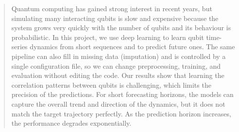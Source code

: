 \begin{abstract}

Quantum computing has gained strong interest in recent years, but simulating many interacting qubits is slow and expensive because the system grows very quickly with the number of qubits and its behaviour is probabilistic. In this project, we use deep learning to learn qubit time-series dynamics from short sequences and to predict future ones. The same pipeline can also fill in missing data (imputation) and is controlled by a single configuration file, so we can change preprocessing, training, and evaluation without editing the code.
Our results show that learning the correlation patterns between qubits is challenging, which limits the precision of the predictions. For short forecasting horizons, the models can capture the overall trend and direction of the dynamics, but it does not match the target trajectory perfectly. As the prediction horizon increases, the performance degrades exponentially.

\end{abstract}
